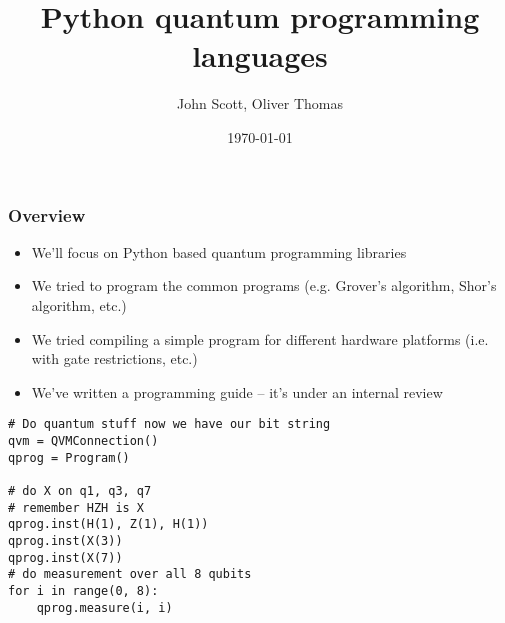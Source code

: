\documentclass{beamer}
\title{Python quantum programming languages}
\author{John Scott, Oliver Thomas}
\institute{Quantum Engineering CDT \\ University of Bristol}
\date{\today}
\begin{document}
\frame{\titlepage}

\begin{frame}
\frametitle{Overview}
\begin{itemize}
    \item We'll focus on Python based quantum programming libraries
    \item We tried to program the common programs (e.g. Grover's algorithm, Shor's algorithm, etc.)
    \item We tried compiling a simple program for different hardware platforms (i.e. with gate restrictions, etc.)
    \item We've written a programming guide -- it's under an internal review
\end{itemize}
\end{frame}

\begin{frame}[fragile]
    \begin{verbatim}
# Do quantum stuff now we have our bit string 
qvm = QVMConnection() 
qprog = Program() 

# do X on q1, q3, q7 
# remember HZH is X 
qprog.inst(H(1), Z(1), H(1)) 
qprog.inst(X(3)) 
qprog.inst(X(7)) 
# do measurement over all 8 qubits 
for i in range(0, 8): 
    qprog.measure(i, i) 
  \end{verbatim}
\end{frame}
\end{document}

